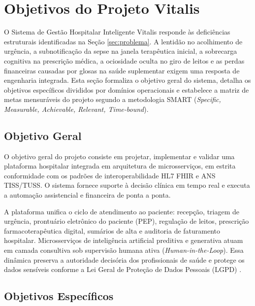 
\section{Objetivos do Projeto Vitalis}
\label{sec:objetivos}

O Sistema de Gestão Hospitalar Inteligente Vitalis responde às deficiências estruturais identificadas na Seção \ref{sec:problema}. A lentidão no acolhimento de urgência, a subnotificação da sepse na janela terapêutica inicial, a sobrecarga cognitiva na prescrição médica, a ociosidade oculta no giro de leitos e as perdas financeiras causadas por glosas na saúde suplementar exigem uma resposta de engenharia integrada. Esta seção formaliza o objetivo geral do sistema, detalha os objetivos específicos divididos por domínios operacionais e estabelece a matriz de metas mensuráveis do projeto segundo a metodologia SMART (\textit{Specific, Measurable, Achievable, Relevant, Time-bound}).

\subsection{Objetivo Geral}
\label{subsec:objetivo_geral}

O objetivo geral do projeto consiste em projetar, implementar e validar uma plataforma hospitalar integrada em arquitetura de microsserviços, em estrita conformidade com os padrões de interoperabilidade HL7 FHIR e ANS TISS/TUSS. O sistema fornece suporte à decisão clínica em tempo real e executa a automação assistencial e financeira de ponta a ponta.

A plataforma unifica o ciclo de atendimento ao paciente: recepção, triagem de urgência, prontuário eletrônico do paciente (PEP), regulação de leitos, prescrição farmacoterapêutica digital, sumários de alta e auditoria de faturamento hospitalar. Microsserviços de inteligência artificial preditiva e generativa atuam em camada consultiva sob supervisão humana ativa (\textit{Human-in-the-Loop}). Essa dinâmica preserva a autoridade decisória dos profissionais de saúde e protege os dados sensíveis conforme a Lei Geral de Proteção de Dados Pessoais (LGPD) \cite{brasil_lgpd:2018}.

\subsection{Objetivos Específicos}
\label{subsec:objetivos_especificos}

